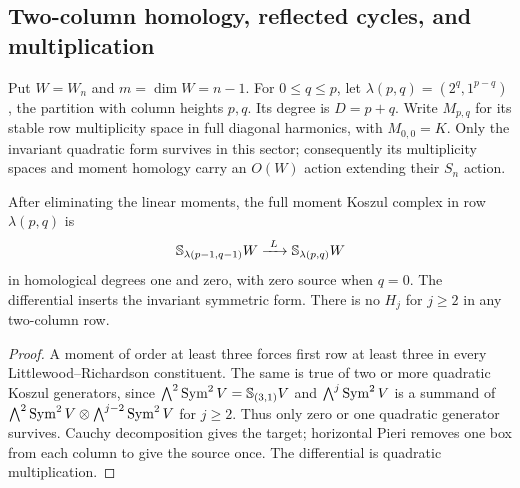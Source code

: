 \subsection{Two-column homology, reflected cycles, and multiplication}
\label{sec:two-column-homology}

Put $W=W_n$ and $m=\dim W=n-1$. For $0\le q\le p$, let
$\lambda(p,q)=(2^q,1^{p-q})$, the partition with column heights $p,q$.
Its degree is $D=p+q$. Write $M_{p,q}$ for its stable row multiplicity
space in full diagonal harmonics, with $M_{0,0}=K$.
Only the invariant quadratic form survives in this sector; consequently
its multiplicity spaces and moment homology carry an $O(W)$ action
extending their $S_n$ action.

\begin{theorem}
\label{thm:two-column-complex}
After eliminating the linear moments, the full moment Koszul complex
in row $\lambda(p,q)$ is
\begin{equation}\label{eq:two-column-two-term}
 \mathbb S_{\lambda(p-1,q-1)}W
                  \xrightarrow{\ L\ }
 \mathbb S_{\lambda(p,q)}W
\end{equation}
in homological degrees one and zero, with zero source when $q=0$.
The differential inserts the invariant symmetric form.
There is no $H_j$ for $j\ge2$ in any two-column row.
\end{theorem}
\begin{proof}
A moment of order at least three forces first row at least three
in every Littlewood--Richardson constituent. The same is true of
two or more quadratic Koszul generators, since
$\bigwedge^2\operatorname{Sym}^2V=\mathbb S_{(3,1)}V$ and
$\bigwedge^j\operatorname{Sym}^2V$ is a summand of
$\bigwedge^2\operatorname{Sym}^2V\otimes\bigwedge^{j-2}\operatorname{Sym}^2V$ for $j\ge2$.
Thus only zero or one quadratic generator survives. Cauchy
decomposition gives the target; horizontal Pieri removes one box
from each column to give the source once. The differential is
quadratic multiplication.
\end{proof}

